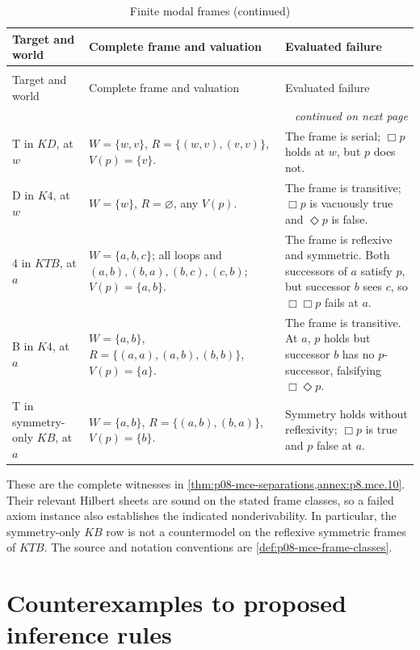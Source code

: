 \begin{longtable}{@{}p{}p{}p{}@{}}
\caption{Finite modal frames}\\
\toprule
Target and world & Complete frame and valuation & Evaluated failure \\
\midrule
\endfirsthead
\caption[]{Finite modal frames (continued)}\\
\toprule
Target and world & Complete frame and valuation & Evaluated failure \\
\midrule
\endhead
\midrule\multicolumn{3}{r}{\emph{continued on next page}}\\
\endfoot
\endlastfoot
T in \(KD\), at \(w\) &
\(W=\{w,v\}\), \(R=\{(w,v),(v,v)\}\), \(V(p)=\{v\}\). &
The frame is serial; \(\Box p\) holds at \(w\), but \(p\) does not. \\
D in \(K4\), at \(w\) &
\(W=\{w\}\), \(R=\varnothing\), any \(V(p)\). &
The frame is transitive; \(\Box p\) is vacuously true and
\(\Diamond p\) is false. \\
4 in \(KTB\), at \(a\) &
\(W=\{a,b,c\}\); all loops and \((a,b),(b,a),(b,c),(c,b)\);
\(V(p)=\{a,b\}\). &
The frame is reflexive and symmetric. Both successors of \(a\) satisfy
\(p\), but successor \(b\) sees \(c\), so \(\Box\Box p\) fails at \(a\). \\
B in \(K4\), at \(a\) &
\(W=\{a,b\}\), \(R=\{(a,a),(a,b),(b,b)\}\), \(V(p)=\{a\}\). &
The frame is transitive. At \(a\), \(p\) holds but successor \(b\)
has no \(p\)-successor, falsifying \(\Box\Diamond p\). \\
T in symmetry-only \(KB\), at \(a\) &
\(W=\{a,b\}\), \(R=\{(a,b),(b,a)\}\), \(V(p)=\{b\}\). &
Symmetry holds without reflexivity; \(\Box p\) is true and \(p\) false
at \(a\). \\
\bottomrule
\end{longtable}

These are the complete witnesses in
\cref{thm:p08-mce-separations,annex:p8.mce.10}. Their relevant Hilbert
sheets are sound on the stated frame classes, so a failed axiom instance
also establishes the indicated nonderivability. In particular, the
symmetry-only \(KB\) row is not a countermodel on the reflexive symmetric
frames of \(KTB\). The source and notation conventions are
\cref{def:p08-mce-frame-classes}\cite{Chellas1980}.

\section{Counterexamples to proposed inference rules}
\label{sec:p14-counter-inference-rules}

